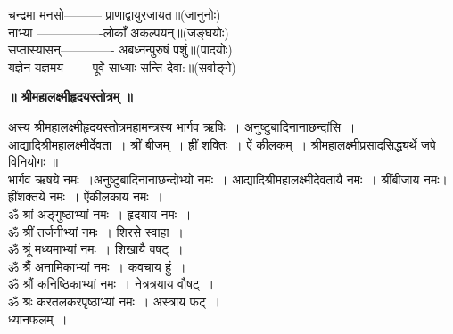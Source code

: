 \documentclass[twoside,top=1.7cm, bottom=1.7cm, outer=1cm,landscape, inner=1.5cm,a5paper,]{book}
\begin{document}
चन्द्रमा मनसो--------- प्राणाद्वायुरजायत॥(जानुनोः)\\
नाभ्या ----------------लोकाँ अकल्पयन्॥(जङ्घयोः)\\
सप्तास्यासन्------------- अबध्नन्पुरुषं पशुं॥(पादयोः)\\
यज्ञेन यज्ञमय-------पूर्वे साध्याः सन्ति देवा:॥(सर्वाङ्गे)
\newpage
\begin{center}{\bfseries\Huge ॥ श्रीमहालक्ष्मीहृदयस्तोत्रम् ॥}\end{center}
अस्य श्रीमहालक्ष्मीहृदयस्तोत्रमहामन्त्रस्य भार्गव ऋषिः~। अनुष्टुबादिनानाछन्दांसि~। आद्यादिश्रीमहालक्ष्मीर्देवता~। श्रीं बीजम्~। ह्रीं शक्तिः~। ऐं कीलकम्~। श्रीमहालक्ष्मीप्रसादसिद्ध्यर्थे जपे विनियोगः ॥\\
भार्गव ऋषये नमः~।अनुष्टुबादिनानाछन्दोभ्यो नमः~। आद्यादिश्रीमहालक्ष्मीदेवतायै नमः~। श्रींबीजाय नमः। ह्रींशक्तये नमः~। ऐंकीलकाय नमः~।\\
ॐ श्रां अङ्गुष्ठाभ्यां नमः~। हृदयाय नमः~।\\
ॐ श्रीं तर्जनीभ्यां नमः~। शिरसे स्वाहा~।\\
ॐ श्रूं मध्यमाभ्यां नमः~। शिखायै वषट्~।\\
ॐ श्रैं अनामिकाभ्यां नमः~। कवचाय हुं~।\\
ॐ श्रौं कनिष्ठिकाभ्यां नमः~। नेत्रत्रयाय वौषट्~।\\
ॐ श्रः करतलकरपृष्ठाभ्यां नमः~। अस्त्राय फट्~।\\
ध्यानफलम् ॥
\end{document}
